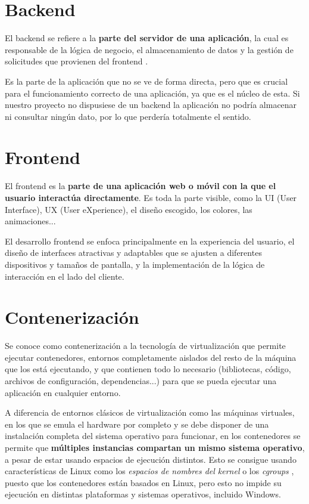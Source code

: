 \section{Backend}


El backend se refiere a la \textbf{parte del servidor de una aplicación}, la cual es responsable de la lógica de negocio, el almacenamiento de datos y la gestión de solicitudes que provienen del frontend \cite{platzi:backend-frontend}. 

Es la parte de la aplicación que no se ve de forma directa, pero que es crucial para el funcionamiento correcto de una aplicación, ya que es el núcleo de esta. Si nuestro proyecto no dispusiese de un backend la aplicación no podría almacenar ni consultar ningún dato, por lo que perdería totalmente el sentido.

\section{Frontend}

El frontend es la \textbf{parte de una aplicación web o móvil con la que el usuario interactúa directamente}. Es toda la parte visible, como la UI (User Interface), UX (User eXperience), el diseño escogido, los colores, las animaciones... \cite{platzi:backend-frontend}

El desarrollo frontend se enfoca principalmente en la experiencia del usuario, el diseño de interfaces atractivas y adaptables que se ajusten a diferentes dispositivos y tamaños de pantalla, y la implementación de la lógica de interacción en el lado del cliente.

\section{Contenerización}

Se conoce como contenerización a la tecnología de virtualización que permite ejecutar contenedores, entornos completamente aislados del resto de la máquina que los está ejecutando, y que contienen todo lo necesario (bibliotecas, código, archivos de configuración, dependencias...) para que se pueda ejecutar una aplicación en cualquier entorno.\cite{microsoft:contenedores}

A diferencia de entornos clásicos de virtualización como las máquinas virtuales, en los que se emula el hardware por completo y se debe disponer de una instalación completa del sistema operativo para funcionar, en los contenedores se permite que \textbf{múltiples instancias compartan un mismo sistema operativo}, a pesar de estar usando espacios de ejecución distintos. Esto se consigue usando características de Linux como los \textit{espacios de nombres del kernel} o los \textit{cgroups} \cite{medium:kernelspace}, puesto que los contenedores están basados en Linux, pero esto no impide su ejecución en distintas plataformas y sistemas operativos, incluido Windows.
